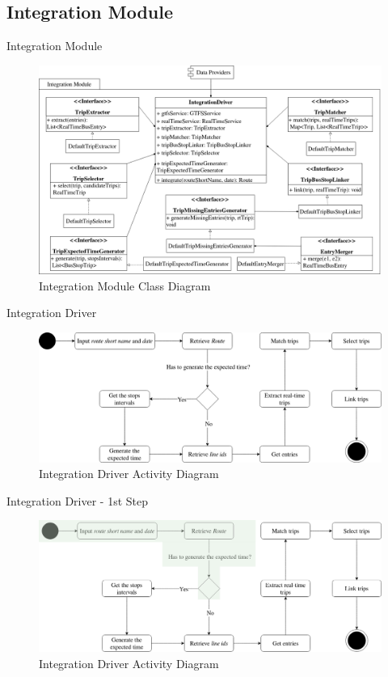 \documentclass[xcolor=dvipsnames,table]{beamer}
\begin{document}
\subsection{Integration Module}
\begin{frame}{Integration Module}
        \begin{figure}[H]
                \centering
                \includegraphics[scale=.205]{images/integrationModuleCD.png}
                \caption{Integration Module Class Diagram}
        \end{figure}
\end{frame}
\begin{frame}{Integration Driver}
        \begin{figure}[H]
                \centering
                \includegraphics[width = \textwidth]{images/integrationDriverAD.drawio.png}
                \caption{Integration Driver Activity Diagram}
        \end{figure}
\end{frame}
\begin{frame}{Integration Driver - 1st Step}
        \begin{figure}[H]
                \centering
                \includegraphics[width = \textwidth]{images/integrationDriverAD(1st_step).png}
                \caption{Integration Driver Activity Diagram}
        \end{figure}
\end{frame}
\end{document}
